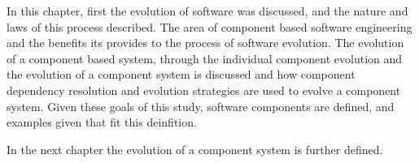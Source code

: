 In this chapter, first the evolution of software was discussed, and the nature and laws of this process described.
The area of component based software engineering and the benefits its provides to the process of software evolution.
The evolution of a component based system, through the individual component evolution and the evolution of a component system is discussed
and how component dependency resolution and evolution strategies are used to evolve a component system.
Given these goals of this study, software components are defined, and examples given that fit this deinfition.

In the next chapter the evolution of a component system is further defined.













